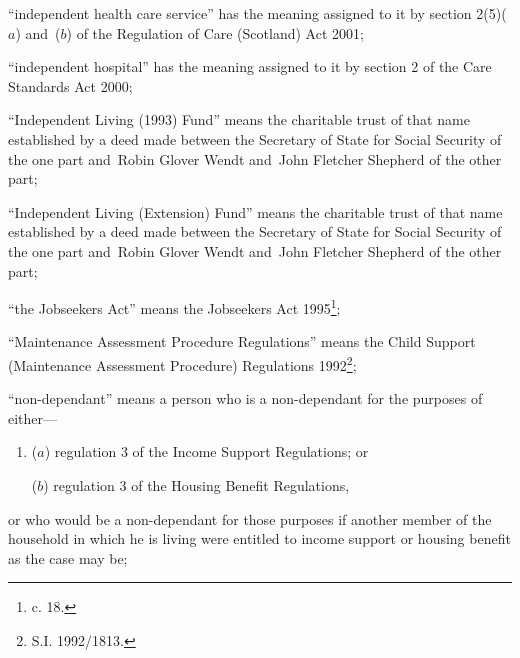 \documentclass[12pt,a4paper]{article}
\begin{document}
\begin{enumerate}
“independent health care service” has the meaning assigned to it by section 2(5)($a$)  and~($b$)  of the Regulation of Care (Scotland) Act 2001;

“independent hospital” has the meaning assigned to it by section 2 of the Care Standards Act 2000;

“Independent Living (1993) Fund” means the charitable trust of that name established by a deed made between the Secretary of State for Social Security of the one part and~Robin Glover Wendt and~John Fletcher Shepherd of the other part;

“Independent Living (Extension) Fund” means the charitable trust of that name established by a deed made between the Secretary of State for Social Security of the one part and~Robin Glover Wendt and~John Fletcher Shepherd of the other part;

“the Jobseekers Act” means the Jobseekers Act 1995\footnote{ c. 18.};

“Maintenance Assessment Procedure Regulations” means the Child Support (Maintenance Assessment Procedure) Regulations 1992\footnote{\frenchspacing S.I. 1992/1813.};


“non-dependant” means a person who is a non-dependant for the purposes of either—
\begin{enumerate}\item[]
($a$)
regulation 3 of the Income Support Regulations; or

($b$)
regulation 3 of the Housing Benefit Regulations,
\end{enumerate}
or who would be a non-dependant for those purposes if another member of the household in which he is living were entitled to income support or housing benefit as the case may be;



\end{enumerate}
\end{document}

